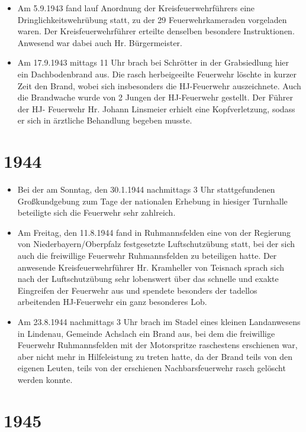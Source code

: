 \documentclass[12pt,a4paper]{book}
\begin{document}
\begin{itemize}
\item Am 5.9.1943 fand lauf Anordnung der Kreisfeuerwehrführers eine
Dringlichkeitswehrübung statt, zu der 29 Feuerwehrkameraden vorgeladen waren.
Der Kreisfeuerwehrführer erteilte denselben besondere Instruktionen. Anwesend
war dabei auch Hr. Bürgermeister.

\item Am 17.9.1943 mittags 11 Uhr brach bei Schrötter in der Grabsiedlung hier
ein Dachbodenbrand aus. Die rasch herbeigeeilte Feuerwehr löschte in kurzer Zeit
den Brand, wobei sich insbesonders die HJ-Feuerwehr auszeichnete. Auch die
Brandwache wurde von 2 Jungen der HJ-Feuerwehr gestellt. Der Führer der HJ-
Feuerwehr Hr. Johann Linsmeier erhielt eine Kopfverletzung, sodass er sich in
ärztliche Behandlung begeben musste.
\end{itemize}

\section*{1944}

\begin{itemize}
\item Bei der am Sonntag, den 30.1.1944 nachmittags 3 Uhr stattgefundenen
Großkundgebung zum Tage der nationalen Erhebung in hiesiger Turnhalle beteiligte
sich die Feuerwehr sehr zahlreich.

\item Am Freitag, den 11.8.1944 fand in Ruhmannsfelden eine von der Regierung
von Niederbayern/Oberpfalz festgesetzte Luftschutzübung statt, bei der sich auch
die freiwillige Feuerwehr Ruhmannsfelden zu beteiligen hatte. Der anwesende
Kreisfeuerwehrführer Hr. Kramheller von Teisnach sprach sich nach der
Luftschutzübung sehr lobenswert über das schnelle und exakte Eingreifen der
Feuerwehr aus und spendete besonders der tadellos arbeitenden HJ-Feuerwehr ein
ganz besonderes Lob.

\item Am 23.8.1944 nachmittags 3 Uhr brach im Stadel eines kleinen Landanwesens
in Lindenau, Gemeinde Achslach ein Brand aus, bei dem die freiwillige Feuerwehr
Ruhmannsfelden mit der Motorspritze raschestens erschienen war, aber nicht mehr
in Hilfeleistung zu treten hatte, da der Brand teils von den eigenen Leuten,
teils von der erschienen Nachbarsfeuerwehr rasch gelöscht werden konnte.
\end{itemize}

\section*{1945}
\end{document}
